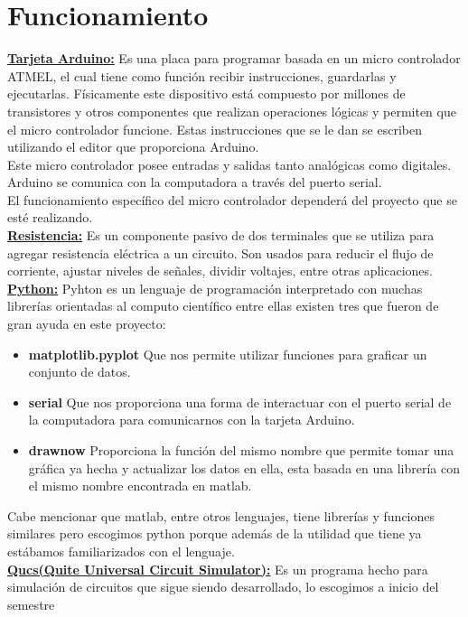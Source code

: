 \documentclass{article}
\begin{document}
\section{Funcionamiento}
\noindent
\textbf{\underline{Tarjeta Arduino:}} Es una placa para programar basada en un micro controlador
ATMEL, el cual tiene como función recibir instrucciones, guardarlas y ejecutarlas.
Físicamente este dispositivo está compuesto por millones de transistores y otros
componentes que realizan operaciones lógicas y permiten que el micro controlador funcione.
Estas instrucciones que se le dan se escriben utilizando el editor que proporciona
Arduino.\\
Este micro controlador posee entradas y salidas tanto analógicas como digitales. Arduino
se comunica con la computadora a través del puerto serial.\\
El funcionamiento específico del micro controlador dependerá del proyecto que se esté
realizando.\\
\textbf{\underline{Resistencia:}} Es un componente pasivo de dos terminales que se utiliza para
agregar resistencia eléctrica a un circuito. Son usados para reducir el flujo de
corriente, ajustar niveles de señales, dividir voltajes, entre otras aplicaciones.\\
\textbf{\underline{Python:}} Pyhton es un lenguaje de programación interpretado con muchas
librerías orientadas al computo científico entre ellas existen tres que fueron de gran
ayuda en este proyecto:
\begin{itemize}
\item \textbf{matplotlib.pyplot} Que nos permite utilizar funciones para graficar un
conjunto de datos.
\item \textbf{serial} Que nos proporciona una forma de interactuar con el puerto serial de
la computadora para comunicarnos con la tarjeta Arduino.
\item \textbf{drawnow} Proporciona la función del mismo nombre que permite tomar una
gráfica ya hecha y actualizar los datos en ella, esta basada en una librería con el mismo
nombre encontrada en matlab.
\end{itemize}
Cabe mencionar que matlab, entre otros lenguajes, tiene librerías y funciones similares
pero escogimos python porque además de la utilidad que tiene ya estábamos familiarizados
con el lenguaje.\\
\textbf{\underline{Qucs(Quite Universal Circuit Simulator):}} Es un programa hecho para
simulación de circuitos que sigue siendo desarrollado, lo escogimos a inicio del semestre
\end{document}

